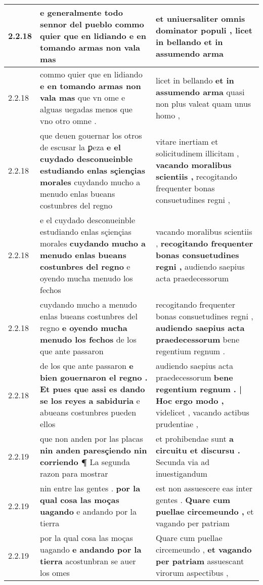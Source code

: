 \begin{tabular}{|p{1cm}|p{6.5cm}|p{6.5cm}|}
2.2.18 & e generalmente todo sennor del pueblo \textbf{ commo quier que en lidiando } e en tomando armas non vala mas & et uniuersaliter omnis dominator populi , \textbf{ licet in bellando } et in assumendo arma \\\hline
2.2.18 & commo quier que en lidiando \textbf{ e en tomando armas non vala mas } que vn ome e alguas uegadas menos que vno otro omne . & licet in bellando \textbf{ et in assumendo arma } quasi non plus valeat quam unus homo , \\\hline
2.2.18 & que deuen gouernar los otros de escusar la ꝑeza \textbf{ e el cuydado desconueinble estudiando enlas sçiençias morales } cuydando mucho a menudo enlas bueans costunbres del regno & vitare inertiam et solicitudinem illicitam , \textbf{ vacando moralibus scientiis , } recogitando frequenter bonas consuetudines regni , \\\hline
2.2.18 & e el cuydado desconueinble estudiando enlas sçiençias morales \textbf{ cuydando mucho a menudo enlas bueans costunbres del regno } e oyendo mucħa menudo los fechos & vacando moralibus scientiis , \textbf{ recogitando frequenter bonas consuetudines regni , } audiendo saepius acta praedecessorum \\\hline
2.2.18 & cuydando mucho a menudo enlas bueans costunbres del regno \textbf{ e oyendo mucħa menudo los fechos } de los que ante passaron & recogitando frequenter bonas consuetudines regni , \textbf{ audiendo saepius acta praedecessorum } bene regentium regnum . \\\hline
2.2.18 & de los que ante passaron \textbf{ e bien gouernaron el regno . Et pues que assi es dando se los reyes a sabiduria } e abueans costunbres pueden ellos & audiendo saepius acta praedecessorum \textbf{ bene regentium regnum . | Hoc ergo modo , } videlicet , vacando actibus prudentiae , \\\hline
2.2.19 & que non anden por las placas \textbf{ nin anden paresçiendo nin corriendo ¶ } La segunda razon para mostrar & et prohibendae sunt \textbf{ a circuitu et discursu . } Secunda via ad inuestigandum \\\hline
2.2.19 & nin entre las gentes . \textbf{ por la qual cosa las moças uagando } e andando por la tierra & est non assuescere eas inter gentes . \textbf{ Quare cum puellae circemeundo , } et vagando per patriam \\\hline
2.2.19 & por la qual cosa las moças uagando \textbf{ e andando por la tierra } acostunbran se auer los omes & Quare cum puellae circemeundo , \textbf{ et vagando per patriam } assuescant virorum aspectibus , \\\hline

\end{tabular}
